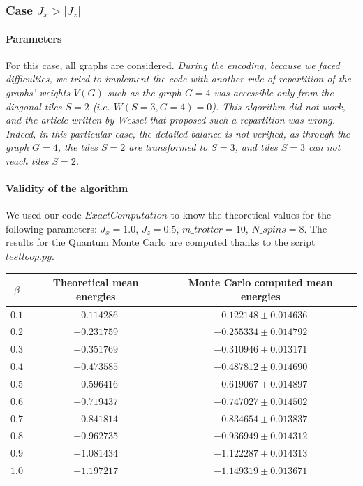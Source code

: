 \documentclass[a4paper,12pt,twoside]{article}
\begin{document}
	
	\subsubsection{Case $J_{x} > |J_{z}$|}
	
	\paragraph{Parameters} For this case, all graphs are considered.
	\emph{During the encoding, because we faced difficulties, we tried to implement the code with another rule of repartition of the graphs' weights $V(G)$ such as the graph $G = 4$ was accessible only from the diagonal tiles $S = 2$ ($i.e.$ $W(S=3, G=4)=0$). This algorithm did not work, and the article written by Wessel that proposed such a repartition was wrong. Indeed, in this particular case, the detailed balance is not verified, as through the graph $G=4$, the tiles $S=2$ are transformed to $S=3$, and tiles $S=3$ can not reach tiles $S=2$.}
	
	\paragraph{Validity of the algorithm} We used our code $ExactComputation$ to know the theoretical values for the following parameters: $J_x = 1.0$, $J_z = 0.5$,  $m\_trotter = 10$,  $N\_spins = 8$. The results for the Quantum Monte Carlo are computed thanks to the script $testloop.py$. \\
	\begin{tabular}[c]{| c || c | c |}
		\hline            
		$\beta$ & Theoretical mean energies & Monte Carlo computed mean energies \\ \hline
		$0.1$ & $-0.114286$ & $-0.122148 \pm 0.014636$ \\ \hline
		$0.2$ & $-0.231759$ & $-0.255334 \pm 0.014792$ \\ \hline
		$0.3$ & $-0.351769$ & $-0.310946 \pm 0.013171$ \\ \hline
		$0.4$ & $-0.473585$ & $-0.487812 \pm 0.014690$ \\ \hline
		$0.5$ & $-0.596416$ & $-0.619067 \pm 0.014897$ \\ \hline
		$0.6$ & $-0.719437$ & $-0.747027 \pm 0.014502$ \\ \hline
		$0.7$ & $-0.841814$ & $-0.834654 \pm 0.013837$ \\ \hline
		$0.8$ & $-0.962735$ & $-0.936949 \pm 0.014312$ \\ \hline
		$0.9$ & $-1.081434$ & $-1.122287 \pm 0.014313$ \\ \hline
		$1.0$ & $-1.197217$ & $-1.149319 \pm 0.013671$ \\ \hline
	\end{tabular} 
	\newline
	
\end{document}
